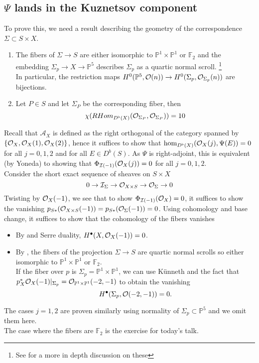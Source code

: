 \subsection*{$\Psi$ lands in the Kuznetsov component}
To prove this, we need a result describing the geometry of the correspondence $\Sigma \subset S\times X$.
\begin{propo}
\begin{enumerate}
	\item The fibers of $\Sigma \to S$ are either isomorphic to $\mathbb{P}^{1}\times \mathbb{P}^{1}$ or $\mathbb{F}_2$ and the embedding $\Sigma_p \to X \to \mathbb{P}^{5}$ describes $\Sigma_p$ as a quartic normal scroll. \footnote{See \cite[Sec. 6.2.6]{Geometry_Cubic_Huybrechts} for a more in depth discussion on these}\\
		In particular, the restriction maps $H^{0}( \mathbb{P}^{5}, \mathcal{O}( n) ) \to H^{0}( \Sigma_p, \mathcal{O}_{\Sigma_p} ( n) ) $ are bijections.
\item Let $P\in S$ and let $\Sigma_P$ be the corresponding fiber, then 
	\[ 
	\chi( RHom_{D^{\flat}( X) } ( \mathcal{O}_{\Sigma_P} , \mathcal{O}_{\Sigma_P} ) ) =10
	\]
\end{enumerate}
\end{propo}
Recall that $\mathcal{A}_X$ is defined as the right orthogonal of the category spanned by $ \left\{ \mathcal{O}_X, \mathcal{O}_X( 1) ,\mathcal{O}_X( 2)  \right\} $, hence it suffices to show that $\hom_{D^{\flat}( X) } ( \mathcal{O}_X( j) , \Psi( E) ) =0 $ for all $j=0,1,2$ and for all $E \in D^{b}( S) $.
As $\Psi$ is right-adjoint, this is equivalent (by Yoneda) to showing that $\Phi_{\mathcal{I}( -1) } ( \mathcal{O}_X( j) ) =0$ for all $j=0,1,2$.\\
Consider the short exact sequence of sheaves on $S\times X$ 
\[ 
0 \to \mathcal{I}_{\Sigma}  \to \mathcal{O}_{X\times S} \to \mathcal{O}_{\Sigma} \to 0
\]
Twisting by $\mathcal{O}_X( -1) $, we see that to show $\Phi_{\mathcal{I}( -1) } ( \mathcal{O}_X) =0$, it suffices to show the vanishing $p_{S\ast} ( \mathcal{O}_{X\times S}( -1)  ) = p_{S\ast} ( \mathcal{O}_{\Sigma}(-1)  ) =0$.
Using cohomology and base change, it suffices to show that the cohomology of the fibers vanishes
\begin{itemize}
	\item By \cite[lemma 1.1.7]{Geometry_Cubic_Huybrechts} and Serre duality, $H^{\bullet}( X,\mathcal{O}_X( -1) ) =0$.
	\item By \cite[lemma 6.2.20]{Geometry_Cubic_Huybrechts}, the fibers of the projection $\Sigma \to S$ are quartic normal scrolls so either isomorphic to $\mathbb{P}^{1}\times \mathbb{P}^{1}$ or $\mathbb{F}_2$.\\
		If the fiber over $p$  is $\Sigma_p =\mathbb{P}^{1}\times \mathbb{P}^{1}$, we can use K\"unneth and the fact that $p_X^{\ast}\mathcal{O}_X( -1) |_{\Sigma_p} = \mathcal{O}_{\mathbb{P}^{1}\times \mathbb{P}^{1}} ( -2,-1)  $ to obtain the vanishing
		\[ 
		H^{\bullet}( \Sigma_p, \mathcal{O}( -2,-1) ) =0.
		\]
\end{itemize}
The cases $j=1,2$ are proven similarly using normality of $\Sigma_p \subset \mathbb{P}^{5}$  and we omit them here.\\
The case where the fibers are $\mathbb{F}_2$ is the exercise for today's talk.

